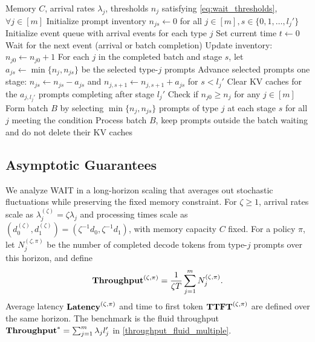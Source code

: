 \begin{algorithm}[h]
\caption{WAIT: Waiting for Accumulated Inference Threshold}
\label{alg:wait}
{\small\linespread{1.0}\selectfont
\begin{algorithmic}[1]
\Require Memory $C$, arrival rates $\lambda_j$, thresholds $n_j$ satisfying \eqref{eq:wait_thresholds}, $\forall j \in [m]$
\State Initialize prompt inventory $n_{js} \gets 0$ for all $j \in [m], s \in \{0, 1, \dots, l_j'\}$
\State Initialize event queue with arrival events for each type $j$
\State Set current time $t \gets 0$
    \State Wait for the next event (arrival or batch completion)
        \State Update inventory: $n_{j0} \gets n_{j0} + 1$  
        \State For each $j$ in the completed batch and stage $s$, let $a_{js}\gets \min\{n_j,n_{js}\}$ be the selected type-$j$ prompts
        \State Advance selected prompts one stage: $n_{js}\gets n_{js}-a_{js}$ and $n_{j,s+1}\gets n_{j,s+1}+a_{js}$ for $s<l_j'$
        \State Clear KV caches for the $a_{j,l_j'}$ prompts completing after stage $l_j'$  
    \EndIf
    \State Check if $n_{j0} \geq n_j$ for any $j \in [m]$  
        \State Form batch $B$ by selecting $\min\{n_j, n_{js}\}$ prompts of type $j$ at each stage $s$ for all $j$ meeting the condition
        \State Process batch $B$, keep prompts outside the batch waiting and do not delete their KV caches
    \EndIf
\EndWhile
\end{algorithmic}
}
\end{algorithm}

\subsection{Asymptotic Guarantees}
\label{subsec:asymptotic_analysis}
\label{subsec:main_theorem}
We analyze WAIT in a long-horizon scaling that averages out stochastic fluctuations while preserving the fixed memory constraint. For \(\zeta\ge 1\), arrival rates scale as \(\lambda_j^{(\zeta)}=\zeta\lambda_j\) and processing times scale as \((d_0^{(\zeta)},d_1^{(\zeta)})=(\zeta^{-1}d_0,\zeta^{-1}d_1)\), with memory capacity \(C\) fixed. For a policy \(\pi\), let \(N_j^{(\zeta,\pi)}\) be the number of completed decode tokens from type-\(j\) prompts over this horizon, and define
\[
\textbf{Throughput}^{(\zeta, \pi)} = \frac{1}{\zeta T} \sum_{j=1}^m N_j^{(\zeta, \pi)}.
\]
Average latency \(\textbf{Latency}^{(\zeta,\pi)}\) and time to first token \(\textbf{TTFT}^{(\zeta,\pi)}\) are defined over the same horizon. The benchmark is the fluid throughput \(\textbf{Throughput}^*=\sum_{j=1}^m \lambda_j l_j'\) in \eqref{throughput_fluid_multiple}.


